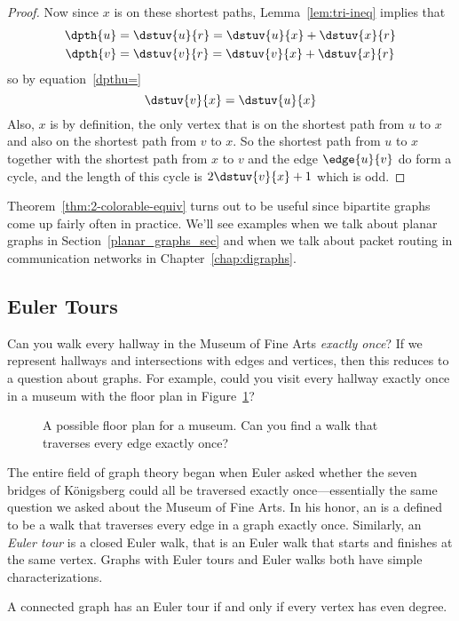 \begin{description}
\begin{editingnotes}
\begin{proof}
Now since $x$ is on these shortest paths, Lemma~\ref{lem:tri-ineq} implies that
\begin{align*}
\dpth{u} & = \dstuv{u}{r} = \dstuv{u}{x} + \dstuv{x}{r}\\
\dpth{v} & = \dstuv{v}{r} = \dstuv{v}{x} + \dstuv{x}{r}
\end{align*}
so by equation~\ref{dpthu=}
\[
\dstuv{v}{x} = \dstuv{u}{x}
\]
Also, $x$ is by definition, the only vertex that is on the shortest
path from $u$ to $x$ and also on the shortest path from $v$ to $x$.
So the shortest path from $u$ to $x$ together with the shortest path from
$x$ to $v$ and the edge $\edge{u}{v}$ do form a cycle, and the length of
this cycle is $2\dstuv{v}{x} +1$ which is odd.
\end{proof}
\end{editingnotes}

\end{description}

Theorem~\ref{thm:2-colorable-equiv} turns out to be useful since bipartite
graphs come up fairly often in practice.  We'll see examples when we talk
about planar graphs in Section~\ref{planar_graphs_sec} and when we talk
about packet routing in communication networks in
Chapter~\ref{chap:digraphs}.

\subsection{Euler Tours}

Can you walk every hallway in the Museum of Fine Arts \emph{exactly
  once}?  If we represent hallways and intersections with edges and
vertices, then this reduces to a question about graphs.  For example,
could you visit every hallway exactly once in a museum with the
floor plan in Figure~\ref{fig:5BC}?

\begin{figure}



\caption{A possible floor plan for a museum. Can you find a walk that
  traverses every edge exactly once?}

\label{fig:5BC}

\end{figure}

The entire field of graph theory began when Euler asked whether the seven
bridges of K\"onigsberg could all be traversed exactly once---essentially
the same question we asked about the Museum of Fine Arts.  In his honor,
an   is a defined to be a walk that
traverses every edge in a graph exactly once.  Similarly, an \emph{Euler
  tour} is a closed Euler walk, that is an Euler walk that
  starts and finishes at the same vertex.  Graphs with Euler tours and
  Euler walks both have simple characterizations.
\begin{theorem}\label{thm:euler-tour}
A connected graph has an Euler tour if and only if every vertex has
even degree.
\end{theorem}

